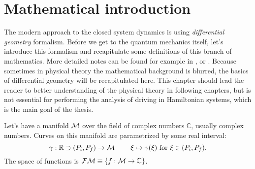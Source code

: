 \chapter{Mathematical introduction}
\label{chap:mathIntro}
The modern approach to the closed system dynamics is using \emph{differential geometry} formalism. Before we get to the quantum mechanics itself, let's introduce this formalism and recapitulate some definitions of this branch of mathematics. More detailed notes can be found for example in \cite{lu}, or \cite{fecko}. Because sometimes in physical theory the mathematical background is blurred, the basics of differential geometry will be recapitulated here. This chapter should lead the reader to better understanding of the physical theory in following chapters, but is not essential for performing the analysis of driving in Hamiltonian systems, which is the main goal of the thesis.

Let's have a manifold $\mathcal{M}$ over the field of complex numbers $\mathbb C$, usually complex numbers. Curves on this manifold are parametrized by some real interval:
$$\gamma:\mathbb{R} \supset (P_i,P_f) \rightarrow \mathcal{M}\; \qquad \xi\mapsto \gamma(\xi) \text{  for } \xi \in (P_i,P_f) .$$ 
The space of functions is $\mathcal{FM}\equiv\{f:\mathcal{M}\rightarrow \mathbb{C}\}$.


